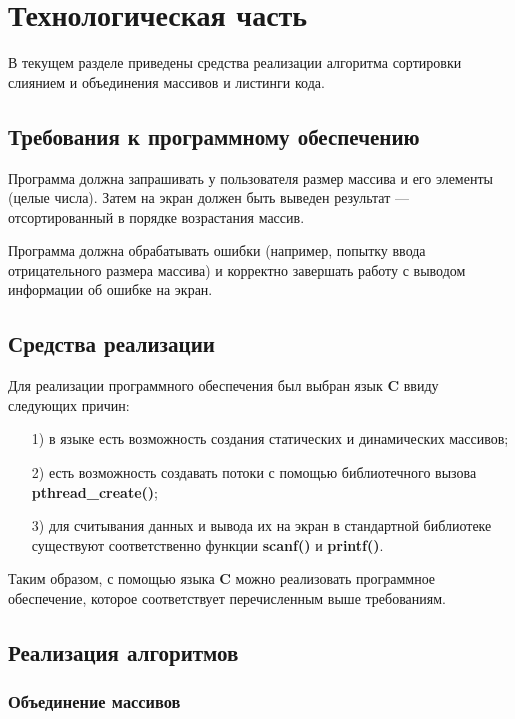 \chapter{Технологическая часть}

В текущем разделе приведены средства реализации алгоритма сортировки слиянием и объединения массивов и листинги кода.

\section{Требования к программному обеспечению}

Программа должна запрашивать у пользователя размер массива и его элементы (целые числа). 
Затем на экран должен быть выведен результат --- отсортированный в порядке возрастания массив.

Программа должна обрабатывать ошибки (например, попытку ввода отрицательного размера массива) и корректно завершать работу с выводом информации об ошибке на экран.
 
\section{Средства реализации}

Для реализации программного обеспечения был выбран язык \textbf{C} ввиду следующих причин:

\begin{enumerate}
\item[1)]
в языке есть возможность создания статических и динамических массивов;
\item[2)]
есть возможность создавать потоки с помощью библиотечного вызова \textbf{pthread\_create()};
\item[3)]
для считывания данных и вывода их на экран в стандартной библиотеке существуют соответственно функции \textbf{scanf()} и \textbf{printf()}.
\end{enumerate}

Таким образом, с помощью языка \textbf{C} можно реализовать программное обеспечение, которое соответствует перечисленным выше требованиям.

\section{Реализация алгоритмов}

\subsection{Объединение массивов}

